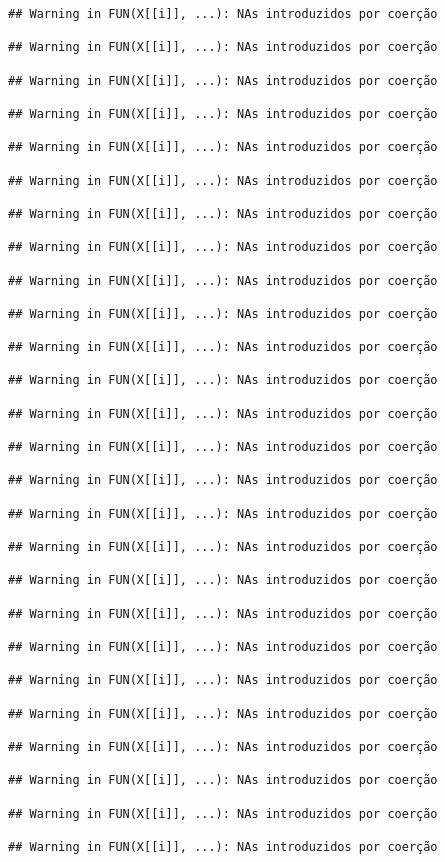\documentclass[
]{article}
\begin{document}
\begin{verbatim}
## Warning in FUN(X[[i]], ...): NAs introduzidos por coerção

## Warning in FUN(X[[i]], ...): NAs introduzidos por coerção

## Warning in FUN(X[[i]], ...): NAs introduzidos por coerção

## Warning in FUN(X[[i]], ...): NAs introduzidos por coerção

## Warning in FUN(X[[i]], ...): NAs introduzidos por coerção

## Warning in FUN(X[[i]], ...): NAs introduzidos por coerção

## Warning in FUN(X[[i]], ...): NAs introduzidos por coerção

## Warning in FUN(X[[i]], ...): NAs introduzidos por coerção

## Warning in FUN(X[[i]], ...): NAs introduzidos por coerção

## Warning in FUN(X[[i]], ...): NAs introduzidos por coerção

## Warning in FUN(X[[i]], ...): NAs introduzidos por coerção

## Warning in FUN(X[[i]], ...): NAs introduzidos por coerção

## Warning in FUN(X[[i]], ...): NAs introduzidos por coerção

## Warning in FUN(X[[i]], ...): NAs introduzidos por coerção

## Warning in FUN(X[[i]], ...): NAs introduzidos por coerção

## Warning in FUN(X[[i]], ...): NAs introduzidos por coerção

## Warning in FUN(X[[i]], ...): NAs introduzidos por coerção

## Warning in FUN(X[[i]], ...): NAs introduzidos por coerção

## Warning in FUN(X[[i]], ...): NAs introduzidos por coerção

## Warning in FUN(X[[i]], ...): NAs introduzidos por coerção

## Warning in FUN(X[[i]], ...): NAs introduzidos por coerção

## Warning in FUN(X[[i]], ...): NAs introduzidos por coerção

## Warning in FUN(X[[i]], ...): NAs introduzidos por coerção

## Warning in FUN(X[[i]], ...): NAs introduzidos por coerção

## Warning in FUN(X[[i]], ...): NAs introduzidos por coerção

## Warning in FUN(X[[i]], ...): NAs introduzidos por coerção


\end{verbatim}
\end{document}
